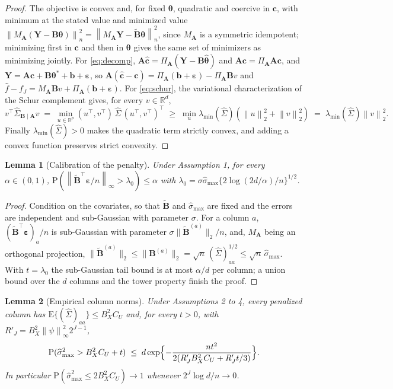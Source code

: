\documentclass[10pt]{book}
\newtheorem{lemma}{Lemma}[section]
\theoremstyle{definition}
\newcommand{\R}{\mathbb{R}}
\newcommand{\E}{\mathrm{E}}
\newcommand{\Prob}{\mathrm{P}}
\newcommand{\T}{^{\top}}
\newcommand{\norm}[1]{\left\lVert #1 \right\rVert}
\newcommand{\normn}[1]{\left\lVert #1 \right\rVert_{n}}
\newcommand{\btheta}{\boldsymbol{\theta}}
\newcommand{\thetastar}{\btheta^{*}}
\newcommand{\thetahat}{\widehat{\btheta}}
\newcommand{\bc}{\mathbf{c}}
\newcommand{\chat}{\widehat{\mathbf{c}}}
\newcommand{\Gramhat}{\widehat{\Sigma}}
\newcommand{\pen}{\lambda}
\newcommand{\Amat}{\mathbf{A}}
\newcommand{\Bmat}{\mathbf{B}}
\newcommand{\Btil}{\widetilde{\Bmat}}
\newcommand{\PA}{\Pi_{\Amat}}
\newcommand{\MA}{M_{\Amat}}
\newcommand{\bveps}{\boldsymbol{\varepsilon}}
\newcommand{\bb}{\mathbf{b}}
\newcommand{\bY}{\mathbf{Y}}
\newcommand{\smax}{\widehat{\sigma}_{\max}}
\newcommand{\lmin}{\lambda_{\min}}
\newcommand{\GBA}{\Gramhat_{\Bmat\mid\Amat}}
\begin{document}
\begin{proof}
The objective is convex and, for fixed $\btheta$, quadratic and coercive in
$\bc$, with minimum at the stated value and minimized value
$\normn{\MA(\bY-\Bmat\btheta)}^2 = \normn{\MA\bY-\Btil\btheta}^2$, since $\MA$
is a symmetric idempotent; minimizing first in $\bc$ and then in $\btheta$
gives the same set of minimizers as minimizing jointly. For
\eqref{eq:decomp}, $\Amat\chat = \PA(\bY-\Bmat\thetahat)$ and
$\Amat\bc = \PA\Amat\bc$, and $\bY = \Amat\bc+\Bmat\thetastar+\bb+\bveps$, so
$\Amat(\chat-\bc) = \PA(\bb+\bveps)-\PA\Bmat v$ and
$\widehat{f}-f_J = \MA\Bmat v + \PA(\bb+\bveps)$. For \eqref{eq:schur}, the
variational characterization of the Schur complement gives, for every
$v \in \R^d$,
\[
  v\T\GBA v \;=\; \min_{u\in\R^p}(u\T,v\T)\,\Gramhat\,(u\T,v\T)\T
  \;\ge\; \min_{u}\lmin(\Gramhat)(\norm{u}_2^2+\norm{v}_2^2)
  \;=\; \lmin(\Gramhat)\norm{v}_2^2 .
\]
Finally $\lmin(\Gramhat)>0$ makes the quadratic term strictly convex, and
adding a convex function preserves strict convexity.
\end{proof}

\begin{lemma}[Calibration of the penalty]
\label{lem:calib}
Under Assumption 1, for every $\alpha \in (0,1)$,
$\Prob(\norm{\Btil\T\bveps/n}_{\infty} > \pen_0) \le \alpha$ with
$\pen_0 = \sigma\smax\{2\log(2d/\alpha)/n\}^{1/2}$.
\end{lemma}

\begin{proof}
Condition on the covariates, so that $\Btil$ and $\smax$ are fixed and the
errors are independent and sub-Gaussian with parameter $\sigma$. For a column
$a$, $(\Btil\T\bveps)_a/n$ is sub-Gaussian with parameter
$\sigma\lVert\Btil^{(a)}\rVert_2/n$, and, $\MA$ being an orthogonal
projection, $\lVert\Btil^{(a)}\rVert_2 \le \lVert\Bmat^{(a)}\rVert_2 =
\sqrt{n}\,(\Gramhat)_{aa}^{1/2} \le \sqrt{n}\,\smax$. With
$t = \pen_0$ the sub-Gaussian tail bound is at most $\alpha/d$ per column; a
union bound over the $d$ columns and the tower property finish the proof.
\end{proof}

\begin{lemma}[Empirical column norms]
\label{lem:columns}
Under Assumptions 2 to 4, every penalized column has
$\E\{(\Gramhat)_{aa}\} \le B_X^2C_U$ and, for every $t>0$, with
$R'_J = B_X^2\norm{\psi}^2_{\infty}2^{J-1}$,
\[
  \Prob(\smax^2 > B_X^2C_U+t) \;\le\;
  d\exp\Bigl\{-\frac{nt^2}{2(R'_JB_X^2C_U+R'_Jt/3)}\Bigr\} .
\]
In particular $\Prob(\smax^2 \le 2B_X^2C_U) \to 1$ whenever
$2^J\log d/n \to 0$.
\end{lemma}
\end{document}
